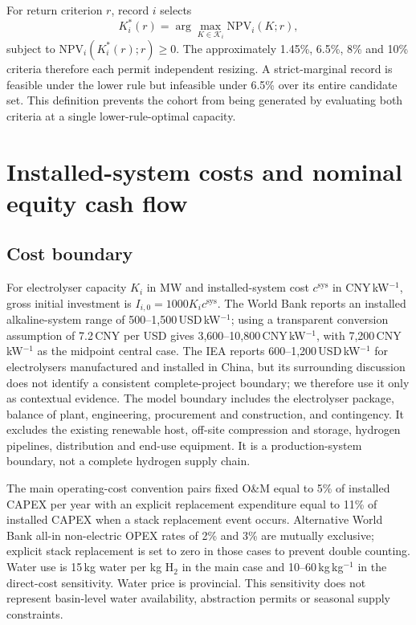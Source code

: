 \documentclass[11pt,a4paper]{article}
\newcommand{\lowhurdle}{approximately 1.45\%}
\begin{document}
For return criterion $r$, record $i$ selects
\begin{equation}
K_i^*(r)=\arg\max_{K\in\mathcal{K}_i}\mathrm{NPV}_i(K;r),
\label{eq:capacitychoice}
\end{equation}
subject to $\mathrm{NPV}_i(K_i^*(r);r)\geq0$. The \lowhurdle, 6.5\%, 8\% and 10\% criteria therefore each permit independent resizing. A strict-marginal record is feasible under the lower rule but infeasible under 6.5\% over its entire candidate set. This definition prevents the cohort from being generated by evaluating both criteria at a single lower-rule-optimal capacity.

\section{Installed-system costs and nominal equity cash flow}\label{sec:finance}

\subsection{Cost boundary}

For electrolyser capacity $K_i$ in MW and installed-system cost $c^{\mathrm{sys}}$ in CNY\,kW$^{-1}$, gross initial investment is $I_{i,0}=1000K_i c^{\mathrm{sys}}$. The World Bank reports an installed alkaline-system range of 500--1,500\,USD\,kW$^{-1}$; using a transparent conversion assumption of 7.2\,CNY per USD gives 3,600--10,800\,CNY\,kW$^{-1}$, with 7,200\,CNY\,kW$^{-1}$ as the midpoint central case\cite{worldbank2026}. The IEA reports 600--1,200\,USD\,kW$^{-1}$ for electrolysers manufactured and installed in China, but its surrounding discussion does not identify a consistent complete-project boundary; we therefore use it only as contextual evidence\cite{iea2025}. The model boundary includes the electrolyser package, balance of plant, engineering, procurement and construction, and contingency. It excludes the existing renewable host, off-site compression and storage, hydrogen pipelines, distribution and end-use equipment. It is a production-system boundary, not a complete hydrogen supply chain.

The main operating-cost convention pairs fixed O\&M equal to 5\% of installed CAPEX per year with an explicit replacement expenditure equal to 11\% of installed CAPEX when a stack replacement event occurs\cite{doe2024}. Alternative World Bank all-in non-electric OPEX rates of 2\% and 3\% are mutually exclusive; explicit stack replacement is set to zero in those cases to prevent double counting\cite{worldbank2026}. Water use is 15\,kg water per kg H$_2$ in the main case and 10--60\,kg\,kg$^{-1}$ in the direct-cost sensitivity. Water price is provincial. This sensitivity does not represent basin-level water availability, abstraction permits or seasonal supply constraints.
\end{document}
